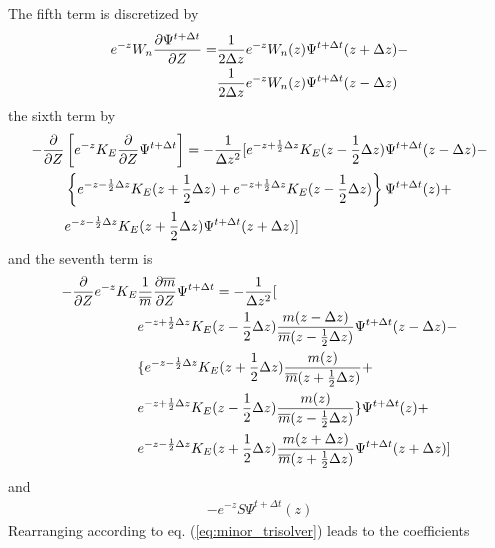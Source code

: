 %
The fifth term is discretized by
%
\begin{align}
  e^{-z} W_n \frac{\partial \Psi^{t+\Delta t}}{\partial Z} = & \frac{1}{2 \Delta
  z} e^{-z} W_n(z)\Psi^{t+\Delta t}(z+\Delta z) - \notag \\
  {} & \frac{1}{2 \Delta
  z} e^{-z} W_n(z)\Psi^{t+\Delta t}(z-\Delta z)
\end{align}
%
the sixth term by
%
\begin{align}
   - \frac{\partial}{\partial Z}&\left[ e^{-z} K_E \frac{\partial}{\partial Z}
   \Psi^{t+\Delta t}\right] = -\frac{1}{\Delta z^2}[ e^{-z+\frac{1}{2}\Delta z}
   K_E (z-\frac{1}{2}\Delta z) \Psi^{t+\Delta t}(z-\Delta z)- \notag \\
   {} &  \left\{
   e^{-z-\frac{1}{2}\Delta z} K_E(z+\frac{1}{2}\Delta z) +
   e^{-z+\frac{1}{2}\Delta z} K_E(z-\frac{1}{2}\Delta z)\right\}\Psi^{t+\Delta t}(z)
   + \notag \\
   {} & e^{-z-\frac{1}{2}\Delta z} K_E(z+\frac{1}{2}\Delta z)\Psi^{t+\Delta t}(z+\Delta z) ]
\end{align}
%
and the seventh term is
%
\begin{align}
 - \frac{\partial}{\partial Z}  e^{-z} K_E &
   \frac{1}{\overline{m}}\frac{\partial\overline{m}}{\partial
   Z} \Psi^{t+\Delta t} = -\frac{1}{\Delta z^2}[ \notag \\
   {} & e^{-z+\frac{1}{2}\Delta z}
   K_E (z-\frac{1}{2}\Delta z) \frac{m(z-\Delta z)}{\overline{m}(z-\frac{1}{2}\Delta z)}\Psi^{t+\Delta t}(z-\Delta z)-
   \notag \\
   {}& \{
   e^{-z-\frac{1}{2}\Delta z} K_E(z+\frac{1}{2}\Delta z)\frac{m(z)}{\overline{m}(z+\frac{1}{2}\Delta z)} +
    \notag \\
   {} & e^{-z+\frac{1}{2}\Delta z} K_E(z-\frac{1}{2}\Delta z)\frac{m(z)}{\overline{m}(z-\frac{1}{2}\Delta z)}\}\Psi^{t+\Delta t}(z)
   + \notag \\
   {} & e^{-z-\frac{1}{2}\Delta z} K_E(z+\frac{1}{2}\Delta z)\frac{m(z+\Delta z)}
   {\overline{m}(z+\frac{1}{2}\Delta z)}\Psi^{t+\Delta t}(z+\Delta z)]
\end{align}
%
and
%
\begin{align}
  -e^{-z}S \Psi^{t+\Delta t}(z)
\end{align}
%
%
Rearranging according to eq. (\ref{eq:minor_trisolver}) leads to the
coefficients
%
